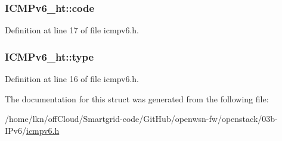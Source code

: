 \subsubsection[{\texorpdfstring{code}{code}}]{ I\+C\+M\+Pv6\+\_\+ht\+::code}\hypertarget{struct_i_c_m_pv6__ht_a00a6e9e2995502d7b2c5e6acd13ba87a}{}\label{struct_i_c_m_pv6__ht_a00a6e9e2995502d7b2c5e6acd13ba87a}


Definition at line 17 of file icmpv6.\+h.

\subsubsection[{\texorpdfstring{type}{type}}]{ I\+C\+M\+Pv6\+\_\+ht\+::type}\hypertarget{struct_i_c_m_pv6__ht_a5d42eb5ccd0b7e69910989cbf76f5da4}{}\label{struct_i_c_m_pv6__ht_a5d42eb5ccd0b7e69910989cbf76f5da4}


Definition at line 16 of file icmpv6.\+h.



The documentation for this struct was generated from the following file\+:\begin{DoxyCompactItemize}
\item 
/home/lkn/off\+Cloud/\+Smartgrid-\/code/\+Git\+Hub/openwsn-\/fw/openstack/03b-\/\+I\+Pv6/\hyperlink{icmpv6_8h}{icmpv6.\+h}\end{DoxyCompactItemize}
